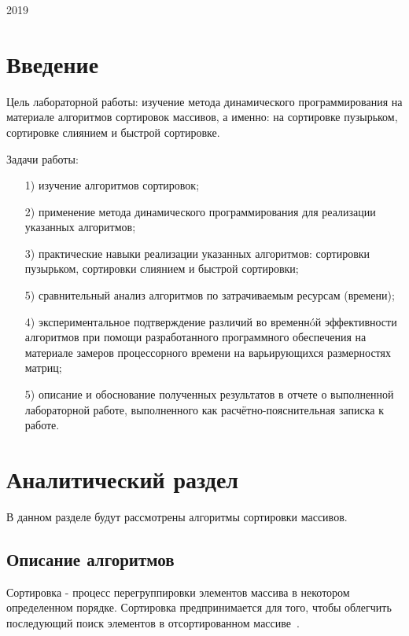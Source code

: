 \documentclass[a4paper,12pt]{article}
\begin{document}
\vspace*{40mm}
\begin{center}
2019    
\end{center}
\thispagestyle{empty}
\pagebreak


\tableofcontents
\pagebreak


\section*{Введение}

Цель лабораторной работы: изучение метода динамического программирования на материале алгоритмов сортировок массивов, а именно: на сортировке пузырьком, сортировке слиянием и быстрой сортировке.

Задачи работы:

	
\begin{enumerate} 
	
	\item[1)] изучение алгоритмов сортировок;
	\item[2)] применение метода динамического программирования для  
	реализации указанных алгоритмов;
	\item[3)] практические навыки реализации указанных алгоритмов: сортировки пузырьком, сортировки слиянием и быстрой сортировки;
	\item[5)] сравнительный анализ алгоритмов по затрачиваемым ресурсам (времени);
	\item[4)] экспериментальное подтверждение различий во временнóй эффективности алгоритмов при помощи разработанного программного обеспечения на материале замеров процессорного времени на варьирующихся размерностях матриц;
	\item[5)] описание и обоснование полученных результатов в отчете о выполненной лабораторной работе, выполненного как расчётно-пояснительная записка к работе. 
\end{enumerate} 
\pagebreak



\section{Аналитический раздел}
	
	В данном разделе будут рассмотрены алгоритмы сортировки массивов. 
	
 
	
	\subsection{Описание алгоритмов}
	Сортировка - процесс перегруппировки элементов массива в некотором определенном порядке. Сортировка предпринимается для того, чтобы облегчить последующий поиск элементов в отсортированном массиве~\cite{bib}.
	
\end{document}

